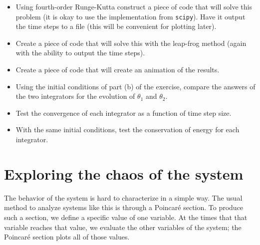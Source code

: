 \documentclass[11pt, preprint]{aastex}
\begin{document}
\begin{itemize}
\item Using fourth-order Runge-Kutta construct a piece of code that
  will solve this problem (it is okay to use the implementation from
  {\tt scipy}). Have it output the time steps to a file (this will be
  convenient for plotting later).
\item Create a piece of code that will solve this with the leap-frog
  method (again with the ability to output the time steps).
\item Create a piece of code that will create an animation of the
  results.
\item Using the initial conditions of part (b) of the exercise,
  compare the answers of the two integrators for the evolution of
  $\theta_1$ and $\theta_2$.
\item Test the convergence of each integrator as a function of time
  step size.
\item With the same initial conditions, test the conservation of
  energy for each integrator.
\end{itemize}

\section{Exploring the chaos of the system}

The behavior of the system is hard to characterize in a simple
way. The usual method to analyze systems like this is through a
Poincar{\'e} section. To produce such a section, we define a specific
value of one variable. At the times that that variable reaches that
value, we evaluate the other variables of the system; the Poincar{\'e}
section plots all of those values.
\end{document}
